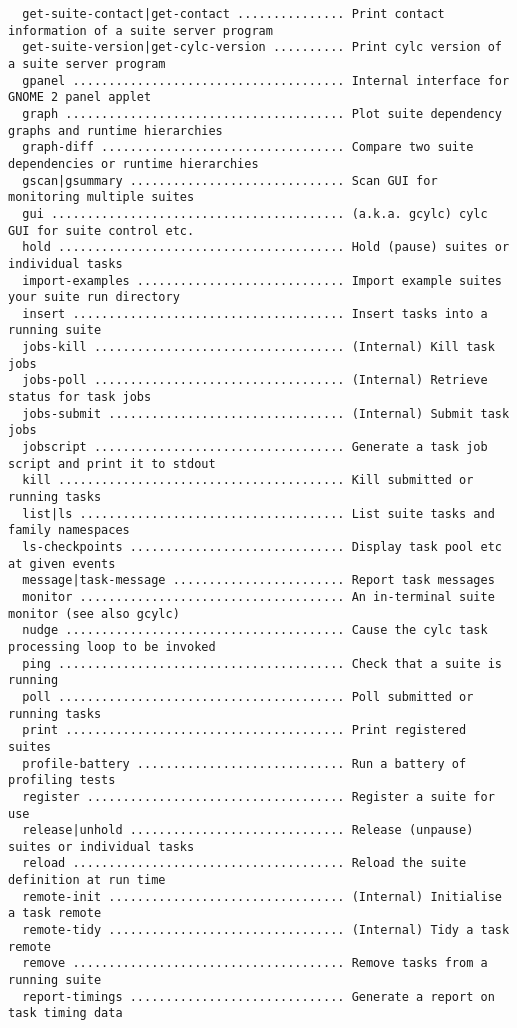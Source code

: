 \begin{lstlisting}
  get-suite-contact|get-contact ............... Print contact information of a suite server program
  get-suite-version|get-cylc-version .......... Print cylc version of a suite server program
  gpanel ...................................... Internal interface for GNOME 2 panel applet
  graph ....................................... Plot suite dependency graphs and runtime hierarchies
  graph-diff .................................. Compare two suite dependencies or runtime hierarchies
  gscan|gsummary .............................. Scan GUI for monitoring multiple suites
  gui ......................................... (a.k.a. gcylc) cylc GUI for suite control etc.
  hold ........................................ Hold (pause) suites or individual tasks
  import-examples ............................. Import example suites your suite run directory
  insert ...................................... Insert tasks into a running suite
  jobs-kill ................................... (Internal) Kill task jobs
  jobs-poll ................................... (Internal) Retrieve status for task jobs
  jobs-submit ................................. (Internal) Submit task jobs
  jobscript ................................... Generate a task job script and print it to stdout
  kill ........................................ Kill submitted or running tasks
  list|ls ..................................... List suite tasks and family namespaces
  ls-checkpoints .............................. Display task pool etc at given events
  message|task-message ........................ Report task messages
  monitor ..................................... An in-terminal suite monitor (see also gcylc)
  nudge ....................................... Cause the cylc task processing loop to be invoked
  ping ........................................ Check that a suite is running
  poll ........................................ Poll submitted or running tasks
  print ....................................... Print registered suites
  profile-battery ............................. Run a battery of profiling tests
  register .................................... Register a suite for use
  release|unhold .............................. Release (unpause) suites or individual tasks
  reload ...................................... Reload the suite definition at run time
  remote-init ................................. (Internal) Initialise a task remote
  remote-tidy ................................. (Internal) Tidy a task remote
  remove ...................................... Remove tasks from a running suite
  report-timings .............................. Generate a report on task timing data

\end{lstlisting}

